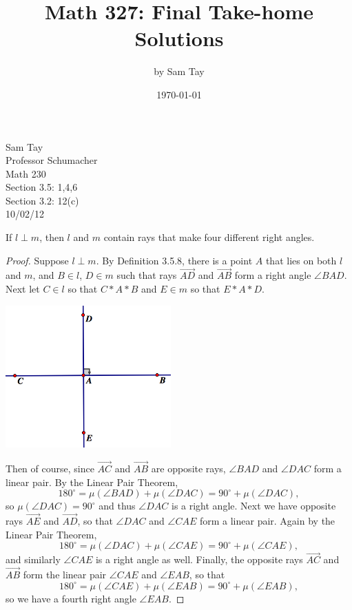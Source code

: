 \documentclass{article}
\title{Math 327: Final Take-home Solutions}
\author{by Sam Tay}
\date{\today}
\newenvironment{problem1}[1]{\noindent {\bf Problem #1:}}
{\medskip}
\newcommand{\ray}[1]{\overrightarrow{#1}}
\renewcommand{\deg}{^{\circ}}
\begin{document}
\begin{flushright}Sam Tay\\ Professor Schumacher \\ Math 230\\ Section 3.5: 1,4,6\\Section 3.2: 12(c)\\10/02/12\\\end{flushright}

\begin{problem1}{1} If $l\perp m$, then $l$ and $m$ contain rays that make four different right angles.
\end{problem1}
\begin{proof} Suppose $l\perp m$. By Definition 3.5.8, there is a point $A$ that lies on both $l$ and $m$, and $B\in l$, $D\in m$ such that rays $\ray{AD}$ and $\ray{AB}$ form a right angle $\angle{BAD}$. Next let $C\in l$ so that $C*A*B$ and $E\in m$ so that $E*A*D$. \\
\begin{center}
\includegraphics[width=2.5in]{S3_5_1.png}
\end{center}
Then of course, since $\ray{AC}$ and $\ray{AB}$ are opposite rays, $\angle{BAD}$ and $\angle{DAC}$ form a linear pair. By the Linear Pair Theorem, $$180\deg=\mu(\angle{BAD})+\mu(\angle{DAC})=90\deg+\mu(\angle{DAC}),$$ so $\mu(\angle{DAC})=90\deg$ and thus $\angle{DAC}$ is a right angle. Next we have opposite rays $\ray{AE}$ and $\ray{AD}$, so that $\angle{DAC}$ and $\angle{CAE}$ form a linear pair. Again by the Linear Pair Theorem, $$180\deg=\mu(\angle{DAC})+\mu(\angle{CAE})=90\deg+\mu(\angle{CAE}),$$ and similarly $\angle{CAE}$ is a right angle as well. Finally, the opposite rays $\ray{AC}$ and $\ray{AB}$ form the linear pair $\angle{CAE}$ and $\angle{EAB}$, so that $$180\deg=\mu(\angle{CAE})+\mu(\angle{EAB})=90\deg+\mu(\angle{EAB}),$$ so we have a fourth right angle $\angle{EAB}$.


\end{proof}
\end{document}
